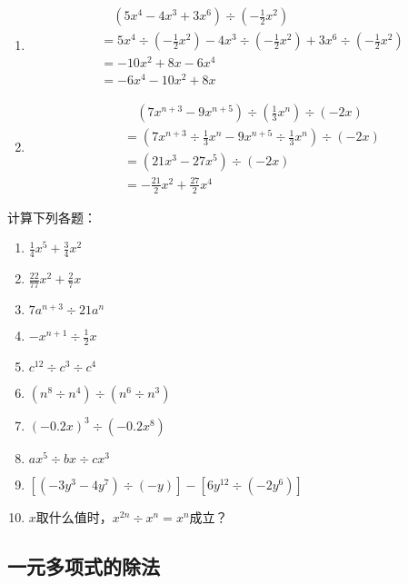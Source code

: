 \begin{solution}
    \begin{enumerate}
        \item \[\begin{split}
            &\quad (5x^4-4x^3+3x^6)\div \left(-\frac{1}{2}x^2\right)\\
            &=  5x^4\div \left(-\frac{1}{2}x^2\right)-4x^3\div \left(-\frac{1}{2}x^2\right)+3x^6 \div \left(-\frac{1}{2}x^2\right)\\
            &=-10x^2+8x-6x^4\\
            &=-6x^4-10x^2+8x   
        \end{split}\]
        \item \[\begin{split}
            &\quad (7x^{n+3}-9x^{n+5})\div \left(\frac{1}{3}x^n\right)\div (-2x)\\
            &=  \left(7x^{n+3} \div\frac{1}{3}x^n-9x^{n+5}\div \frac{1}{3}x^n \right)\div (-2x)\\
            &=(21x^3-27x^5)\div (-2x)\\
            &= -\frac{21}{2}x^2+\frac{27}{2}x^4  
        \end{split}\]
    \end{enumerate}
\end{solution}

\begin{ex}
  计算下列各题：
  \begin{enumerate}
      \item $\frac{1}{4}x^5+\frac{3}{4}x^2$
      \item $\frac{22}{77}x^2+\frac{2}{7}x$
      \item $7a^{n+3}\div 21a^n$
      \item $-x^{n+1}\div \frac{1}{2}x$
      \item $c^{12}\div c^3\div c^4$
      \item $(n^8\div n^4)\div (n^6\div n^3)$
      \item $(-0.2x)^3\div (-0.2x^8)$
      \item $ax^5\div bx\div cx^3$
      \item $\left[(-3y^3-4y^7)\div (-y) \right]-\left[6y^{12}\div (-2y^6) \right]$
      \item $x$取什么值时，$x^{2n}\div x^n=x^n$成立？
  \end{enumerate}
  
\end{ex}

\subsection{一元多项式的除法}

